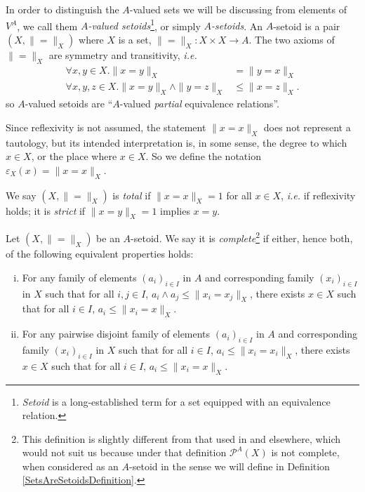 \documentclass{lmcs}
\newcommand{\powerset}{\ensuremath{\mathcal{P}}}
\newcommand{\apowerset}{\powerset^A}
\newcommand{\beq}{\|\mbox{$=$}\|}
\newcommand{\inn}{\varepsilon}
\begin{document}
In order to distinguish the $A$-valued sets we will be discussing from elements of $V^A$, we call them \emph{$A$-valued setoids}\footnote{\emph{Setoid} is a long-established term for a set equipped with an equivalence relation.}, or simply \emph{$A$-setoids}.
An $A$-setoid is a pair $(X,\beq_X)$ where $X$ is a set, $\beq_X : X \times X \rightarrow A$. The two axioms of $\beq_X$ are symmetry and transitivity, \emph{i.e.}
\begin{align*}
	\forall x,y \in X . \| x = y \|_X &= \| y = x \|_X \\
	\forall x,y,z \in X. \| x = y \|_X \land \| y = z \|_X &\leq \| x = z \|_X.
\end{align*}
so $A$-valued setoids are ``$A$-valued \emph{partial} equivalence relations''. 

Since reflexivity is not assumed, the statement $\| x = x \|_X$ does not represent a tautology, but its intended interpretation is, in some sense, the degree to which $x \in X$, or the place where $x \in X$. So we define the notation $\inn_X(x) = \| x = x \|_X$. 

We say $(X, \beq_X)$ is \emph{total} if $\|x = x\|_X = 1$ for all $x \in X$, \emph{i.e.} if reflexivity holds; it is \emph{strict} if $\|x = y\|_X = 1$ implies $x = y$. 

\begin{defi}
	\label{CompletenessDef}
	Let $(X,\beq_X)$ be an $A$-setoid. We say it is \emph{complete}\footnote{This definition is slightly different from that used in \cite[4.10,4.11]{fourman1979} and elsewhere, which would not suit us because under that definition $\apowerset(X)$ is not complete, when considered as an $A$-setoid in the sense we will define in Definition \ref{SetsAreSetoidsDefinition}.} if either, hence both, of the following equivalent properties holds:
	\begin{enumerate}[(i)]
		\item For any family of elements $(a_i)_{i \in I}$ in $A$ and corresponding family $(x_i)_{i \in I}$ in $X$ such that for all $i,j \in I$, $a_i \land a_j \leq \|x_i = x_j\|_X$, there exists $x \in X$ such that for all $i \in I$, $a_i \leq \| x_i = x \|_X$. 
		\item For any pairwise disjoint family of elements $(a_i)_{i \in I}$ in $A$ and corresponding family $(x_i)_{i \in I}$ in $X$ such that for all $i \in I$, $a_i \leq \| x_i = x_i \|_X$, there exists $x \in X$ such that for all $i \in I$, $a_i \leq \| x_i = x\|_X$. 
	\end{enumerate}
\end{defi}
\end{document}
